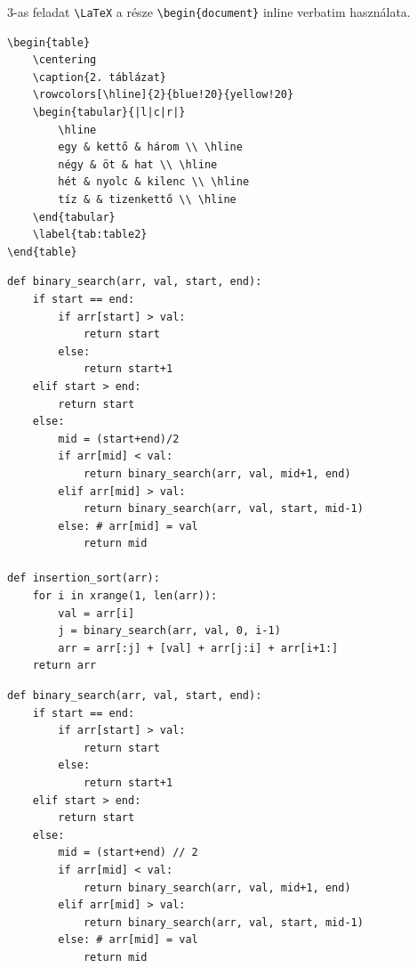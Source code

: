 \documentclass{article}
\begin{document}
3-as feladat \verb|\LaTeX| a része \verb|\begin{document}| inline verbatim használata.

\begin{verbatim}
\begin{table}
    \centering
    \caption{2. táblázat}
    \rowcolors[\hline]{2}{blue!20}{yellow!20}
    \begin{tabular}{|l|c|r|}
        \hline
        egy & kettő & három \\ \hline
        négy & öt & hat \\ \hline
        hét & nyolc & kilenc \\ \hline
        tíz & & tizenkettő \\ \hline
    \end{tabular}
    \label{tab:table2}
\end{table}
\end{verbatim}

\clearpage

\begin{lstlisting}
def binary_search(arr, val, start, end):
	if start == end:
		if arr[start] > val:
			return start
		else:
			return start+1
	elif start > end:
		return start
	else: 
		mid = (start+end)/2
		if arr[mid] < val:
			return binary_search(arr, val, mid+1, end)
		elif arr[mid] > val:
			return binary_search(arr, val, start, mid-1)
		else: # arr[mid] = val
			return mid
			
def insertion_sort(arr):
    for i in xrange(1, len(arr)):
        val = arr[i]
        j = binary_search(arr, val, 0, i-1)
        arr = arr[:j] + [val] + arr[j:i] + arr[i+1:]
    return arr
\end{lstlisting}

\begin{lstlisting}[style=egyediPython, caption={Python példa kód}]
def binary_search(arr, val, start, end):
    if start == end:
        if arr[start] > val:
            return start
        else:
            return start+1
    elif start > end:
        return start
    else: 
        mid = (start+end) // 2
        if arr[mid] < val:
            return binary_search(arr, val, mid+1, end)
        elif arr[mid] > val:
            return binary_search(arr, val, start, mid-1)
        else: # arr[mid] = val
            return mid
\end{lstlisting}

\begin{CCode}
\centering

\end{CCode}

\begin{CCode}
\centering

\end{CCode}
\end{document}
